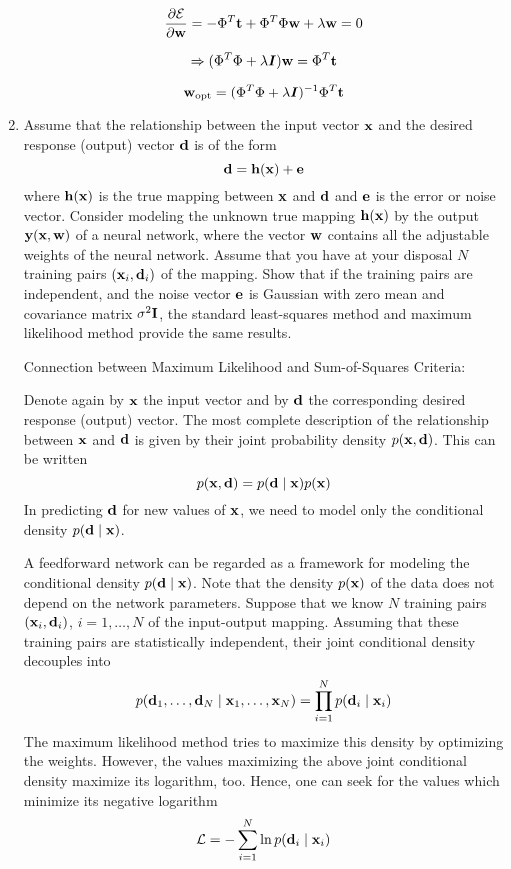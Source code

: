 \begin{enumerate}
\begin{solution}
    \[
    \frac{\partial \mathcal{E}}{\partial {\bf{w}}} = -\Phi^T {\bf{t}} + \Phi^T
    \Phi {\bf{w}} + \lambda {\bf{w}} = 0
    \]

    \[
    \Rightarrow (\Phi^T \Phi + \lambda \boldsymbol{I}){\bf{w}} = \Phi^T {\bf{t}}
    \]

    \[
    {\bf{w}}_{\text{opt}} = (\Phi^T \Phi + \lambda \boldsymbol{I})^{-1}\Phi^T {\bf{t}}
    \]
  \end{solution}
  

\item Assume that the relationship between the input vector ${\bf x}$
  and the desired response (output) vector ${\bf d}$ is of the form
  \[{\bf d} = {\bf h}({\bf x}) + {\bf e}\]
  where ${\bf h}({\bf x})$ is the true mapping between ${\bf x}$ and ${\bf d}$
  and ${\bf e}$ is the error or noise vector. Consider modeling the unknown
  true mapping ${\bf h}({\bf x})$ by the output ${\bf y}({\bf x},{\bf w})$
  of a neural network, where the vector ${\bf w}$ contains all the adjustable
  weights of the neural network. Assume that you have at your disposal
  $N$ training pairs $({\bf x}_i,{\bf d}_i)$ of the mapping. Show that if the
  training pairs are independent, and the noise vector ${\bf e}$
  is Gaussian with zero mean and covariance matrix $\sigma^2 {\bf I}$, the standard
  least-squares method and maximum likelihood method provide the same results.

  \begin{solution}

    Connection between Maximum Likelihood and Sum-of-Squares Criteria:

    Denote again by ${\bf x}$ the input vector and by ${\bf d}$ the
    corresponding desired response (output) vector. The most complete description of the relationship between
    ${\bf x}$ and ${\bf d}$ is given by their joint probability density
    $p({\bf x},{\bf d})$.
    This can be written
    \[
    p({\bf x},{\bf d}) = p({\bf d} \mid {\bf x}) p({\bf x})
    \]
    In predicting ${\bf d}$ for new values of ${\bf x}$, we need to
    model only the conditional density $p({\bf d} \mid {\bf x})$.


    A feedforward network can be regarded as a framework for modeling
    the conditional density $p({\bf d} \mid {\bf x})$. Note that the density $p({\bf x})$ of the data does not depend
    on the network parameters. Suppose that we know $N$ training pairs $({\bf x}_i,{\bf d}_i)$,
    $i=1,\ldots,N$ of the input-output mapping. Assuming that these training pairs are statistically independent,
    their joint conditional density decouples into
    \[
    p({\bf d}_1,\ldots,{\bf d}_N \mid {\bf x}_1,\ldots,{\bf x}_N) =
    \prod_{i=1}^N p({\bf d}_i \mid {\bf x}_i)
    \]
    The maximum likelihood method tries to maximize this density by optimizing the weights.
    However, the values maximizing the above joint conditional density maximize
    its logarithm, too. Hence, one can seek for the values which minimize its
    negative logarithm
    \[
    {\cal L} = - \sum_{i=1}^N \ln p({\bf d}_i \mid {\bf x}_i)
    \]


\end{solution}
\end{enumerate}
